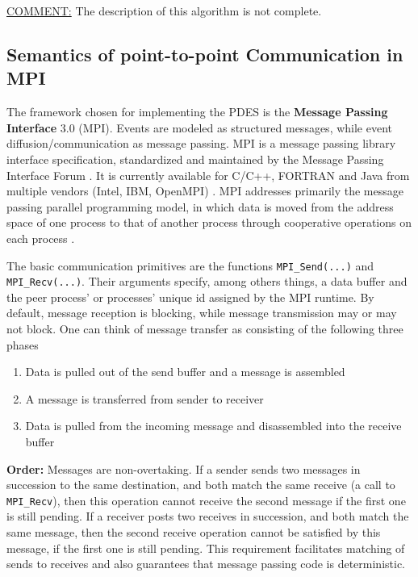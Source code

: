 \documentclass[12pt,twoside]{article}
\begin{document}
\uline{COMMENT:} The description of this algorithm is not complete. 


\subsection{Semantics of point-to-point Communication in MPI}
\label{sec-5-3}
The framework chosen for implementing the PDES is the \textbf{Message Passing Interface} 3.0 (MPI).
Events are modeled as structured messages, while event diffusion/communication as message passing.
MPI is a message passing library interface specification, standardized and maintained by the Message Passing Interface Forum \cite{citation}.
It is currently available for C/C++, FORTRAN and Java from multiple vendors (Intel, IBM, OpenMPI) \cite{citation}.
MPI addresses primarily the message passing parallel programming model, 
in which data is moved from the address space of one process to that of another process through cooperative operations on each process \cite{MessagePassingInterfaceForum2012}.

The basic communication primitives are the functions \texttt{MPI\_Send(...)} and \texttt{MPI\_Recv(...)}.
Their arguments specify, among others things, a data buffer and the peer process' or processes' unique id assigned by the MPI runtime.
By default, message reception is blocking, while message transmission may or may not block.
One can think of message transfer as consisting of the following three phases
\begin{enumerate}
\item Data is pulled out of the send buffer and a message is assembled
\item A message is transferred from sender to receiver
\item Data is pulled from the incoming message and disassembled into the receive buffer
\end{enumerate}

\textbf{Order:}
Messages are non-overtaking.
If a sender sends two messages in succession to the same destination, 
and both match the same receive (a call to \texttt{MPI\_Recv}), 
then this operation cannot receive the second message if the first one is still pending. 
If a receiver posts two receives in succession,
and both match the same message, 
then the second receive operation cannot be satisfied by this message, if the first one is still pending. 
This requirement facilitates matching of sends to receives and also guarantees that message passing code is deterministic.
\end{document}
